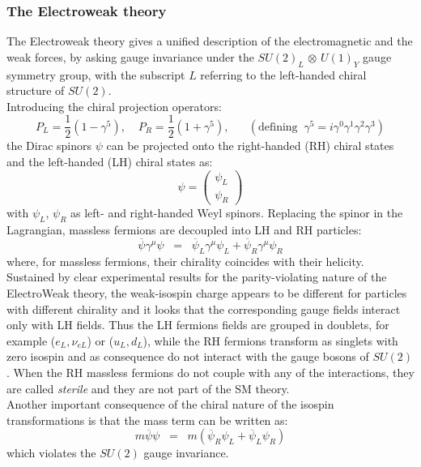 \subsubsection{The Electroweak theory}\label{sec:ewk}
The Electroweak theory gives a unified description of the electromagnetic and the weak forces, by asking gauge invariance under the $SU(2)_{L}$ $\otimes$ $U(1)_{Y}$ gauge symmetry group, with the subscript $L$ referring to the left-handed chiral structure of $SU(2)$.\\
Introducing the chiral projection operators:
\begin{equation}
\label{eq:LRoperators}
P_L=\frac{1}{2} (1-\gamma^5), \;\;\;\ P_R=\frac{1}{2} (1+\gamma^5), \;\; \;\; \;\; (\text{defining} \;\; \gamma^5 = i\gamma^0\gamma^1\gamma^2\gamma^3)
\end{equation}
the Dirac spinors $\psi$ can be projected onto the right-handed (RH) chiral states and the left-handed (LH) chiral states as:
\begin{equation}
\label{eq:LR1}
\psi = \begin{pmatrix}
\psi_L\\
\psi_R
\end{pmatrix}
\end{equation}
with $\psi_L$, $\psi_R$ as left- and right-handed Weyl spinors. Replacing the spinor in the Lagrangian, massless fermions are decoupled into LH and RH particles:
\begin{equation}
\label{eq:LR2}
\overline{\psi} \gamma^{\mu} \psi \;\; = \;\; \overline{\psi}_L\gamma^{\mu} \psi_L +  \overline{\psi}_R\gamma^{\mu} \psi_R
\end{equation}
where, for massless fermions, their chirality coincides with their helicity. Sustained by clear experimental results for the parity-violating nature of the ElectroWeak theory, the weak-isospin charge appears to be different for particles with different chirality and it looks that the corresponding gauge fields interact only with LH fields. Thus the LH fermions fields are grouped in doublets, for example ($e_L,\nu_{eL}$) or ($u_L,d_L$), while the RH fermions transform as singlets with zero isospin and as consequence do not interact with the gauge bosons of $SU(2)$. When the RH massless fermions do not couple with any of the interactions, they are called \emph{sterile} and they are not part of the SM theory.\\
Another important consequence of the chiral nature of the isospin transformations is that the mass term can be written as:
\begin{equation}
\label{eq:LR3}
m\overline{\psi} \psi \;\; = \;\; m(\overline{\psi}_R\psi_L +  \overline{\psi}_L\psi_R)
\end{equation}
which violates the $SU(2)$ gauge invariance. 

